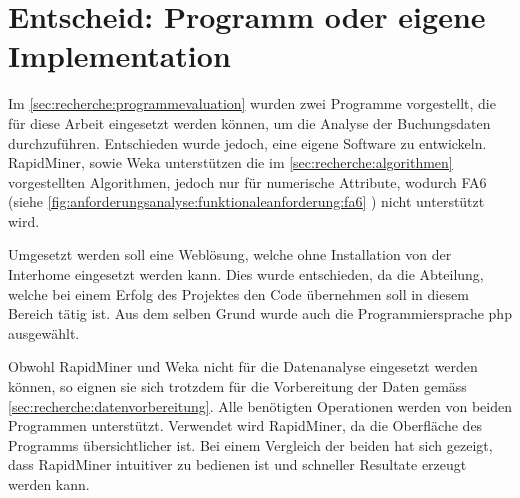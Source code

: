 \section{Entscheid: Programm oder eigene Implementation}
Im \cref{sec:recherche:programmevaluation}  wurden zwei Programme vorgestellt, die für diese Arbeit eingesetzt werden können, um die Analyse der Buchungsdaten durchzuführen. Entschieden wurde jedoch, eine eigene Software zu entwickeln. RapidMiner, sowie Weka unterstützen die im \cref{sec:recherche:algorithmen} vorgestellten Algorithmen, jedoch nur für numerische Attribute, wodurch FA6 (siehe \cref{fig:anforderungsanalyse:funktionaleanforderung:fa6} ) nicht unterstützt wird.

Umgesetzt werden soll eine Weblösung, welche ohne Installation von der Interhome eingesetzt werden kann. Dies wurde entschieden, da die Abteilung, welche bei einem Erfolg des Projektes den Code übernehmen soll in diesem Bereich tätig ist. Aus dem selben Grund wurde auch die Programmiersprache \gls{php} ausgewählt.

Obwohl RapidMiner und Weka nicht für die Datenanalyse eingesetzt werden können, so eignen sie sich trotzdem für die Vorbereitung der Daten gemäss \cref{sec:recherche:datenvorbereitung}. Alle benötigten Operationen werden von beiden Programmen unterstützt. Verwendet wird RapidMiner, da die Oberfläche des Programms übersichtlicher ist. Bei einem Vergleich der beiden hat sich gezeigt, dass RapidMiner intuitiver zu bedienen ist und schneller Resultate erzeugt werden kann.